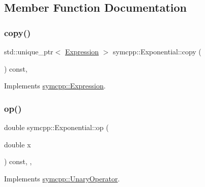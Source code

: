 \subsection{Member Function Documentation}
\mbox{\label{classsymcpp_1_1Exponential_ad6ea3a357a471f75e28761c9a9f0d54d}} 
\subsubsection{\texorpdfstring{copy()}{copy()}}
{\footnotesize\ttfamily std\+::unique\+\_\+ptr$<$ \mbox{\hyperlink{classsymcpp_1_1Expression}{Expression}} $>$ symcpp\+::\+Exponential\+::copy (\begin{DoxyParamCaption}{ }\end{DoxyParamCaption}) const\hspace{0.3cm}{\ttfamily [override]}, {\ttfamily [virtual]}}



Implements \mbox{\hyperlink{classsymcpp_1_1Expression_a2e7de5a295ccf0efdc9b34cea7ba3d0b}{symcpp\+::\+Expression}}.

\mbox{\label{classsymcpp_1_1Exponential_aa36daedb8bf7bfe74f7f5ef85e448a7f}} 
\subsubsection{\texorpdfstring{op()}{op()}}
{\footnotesize\ttfamily double symcpp\+::\+Exponential\+::op (\begin{DoxyParamCaption}\item[{double}]{x }\end{DoxyParamCaption}) const\hspace{0.3cm}{\ttfamily [override]}, {\ttfamily [private]}, {\ttfamily [virtual]}}



Implements \mbox{\hyperlink{classsymcpp_1_1UnaryOperator_a679c3c46cad3a62bdd776ff836c7891e}{symcpp\+::\+Unary\+Operator}}.

\mbox{\label{classsymcpp_1_1Exponential_a73f9208294626b48e2385a08e761b846}} 
